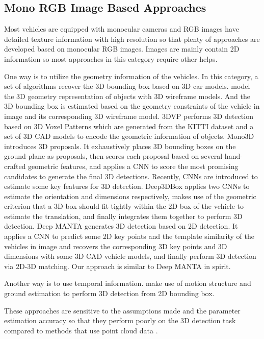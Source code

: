 \subsection{Mono RGB Image Based Approaches}
Most vehicles are equipped with monocular cameras and RGB images have detailed texture information with high resolution so that plenty of approaches are developed based on monocular RGB images. Images are mainly contain 2D information so most approaches in this category require other helps. 

One way is to utilize the geometry information of the vehicles. In this category, a set of algorithms recover the 3D bounding box based on 3D car models. \cite{834, 741} model the 3D geometry representation of objects with 3D wireframe models. And the 3D bounding box is estimated based on the geometry constraints of the vehicle in image and its corresponding 3D wireframe model. 3DVP \cite{xiang2015data} performs 3D detection based on 3D Voxel Patterns which are generated from the KITTI dataset \cite{Geiger2012CVPR} and a set of 3D CAD models to encode the geometric information of objects. Mono3D \cite{cvpr16chen} introduces 3D proposals. It exhaustively places 3D bounding boxes on the ground-plane as proposals, then scores each proposal based on several hand-crafted geometric features, and applies a CNN to score the most promising candidates to generate the final 3D detections. Recently, CNNs are introduced to estimate some key features for 3D detection. Deep3DBox \cite{DBLP:journals/corr/MousavianAFK16} applies two CNNs to estimate the orientation and dimensions respectively, makes use of the geometric criterion that a 3D box should fit tightly within the 2D box of the vehicle to estimate the translation, and finally integrates them together to perform 3D detection. Deep MANTA \cite{DBLP:journals/corr/ChabotCRTC17} generates 3D detection based on 2D detection. It applies a CNN to predict some 2D key points and the template similarity of the vehicles in image and recovers the corresponding 3D key points and 3D dimensions with some 3D CAD vehicle models, and finally perform 3D detection via 2D-3D matching. Our approach is similar to Deep MANTA in spirit.

Another way is to use temporal information. \cite{7780838, 7298997} make use of motion structure and ground estimation to perform 3D detection from 2D bounding box.


These approaches are sensitive to the assumptions made and the parameter estimation accuracy so that they perform poorly on the 3D detection task compared to methods that use point cloud data \tbd.

